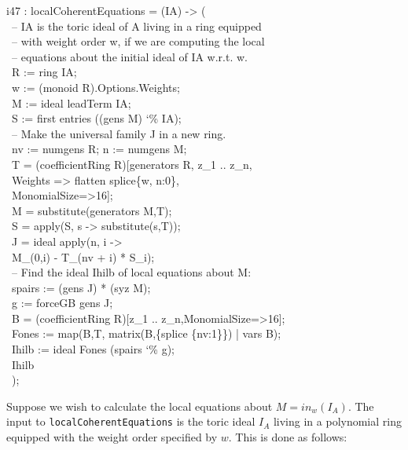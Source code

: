 \beginOutput
i47 : localCoherentEquations = (IA) -> (\\
\           -- IA is the toric ideal of A living in a ring equipped\\
\           -- with weight order w, if we are computing the local \\
\           -- equations about the initial ideal of IA w.r.t. w.\\
\           R := ring IA;\\
\           w := (monoid R).Options.Weights;\\
\           M := ideal leadTerm IA;\\
\           S := first entries ((gens M) {\char`\%} IA);\\
\           -- Make the universal family J in a new ring.\\
\           nv := numgens R; n := numgens M;\\
\           T = (coefficientRing R)[generators R, z_1 .. z_n, \\
\                                   Weights => flatten splice\{w, n:0\},\\
\                                   MonomialSize=>16];\\
\           M = substitute(generators M,T);\\
\           S = apply(S, s -> substitute(s,T));\\
\           J = ideal apply(n, i -> \\
\                     M_(0,i) - T_(nv + i) * S_i);\\
\           -- Find the ideal Ihilb of local equations about M:\\
\           spairs := (gens J) * (syz M);\\
\           g := forceGB gens J;\\
\           B = (coefficientRing R)[z_1 .. z_n,MonomialSize=>16];\\
\           Fones := map(B,T, matrix(B,\{splice \{nv:1\}\}) | vars B);\\
\           Ihilb := ideal Fones (spairs {\char`\%} g);\\
\           Ihilb\\
\           );\\
\endOutput
 
     
Suppose we wish to calculate the local equations about $M =
in_w(I_A)$.  The input to {\tt localCoherentEquations} is the
toric ideal $I_A$ living in a polynomial ring equipped with the 
weight order specified by $w$. This is done as follows:

